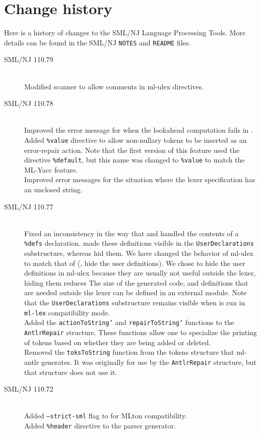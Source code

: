 %
\chapter{Change history}
\label{ch:history}

Here is a history of changes to the SML/NJ Language Processing Tools.
More details can be found in the SML/NJ \texttt{NOTES} and \texttt{README} files.
\begin{description}
  \item[SML/NJ 110.79]
    \mbox{}\\[0.5em]
    Modified scanner to allow comments in ml-ulex directives.
  \item[SML/NJ 110.78]
    \mbox{}\\[0.5em]
    Improved the error message for when the lookahead computation fails in \mlantlr{}.
    \\[0.5em]
    Added \texttt{\%value} directive to allow non-nullary tokens to be inserted as
    an error-repair action.
    Note that the first version of this feature used the directive \texttt{\%default}, but
    this name was changed to \texttt{\%value} to match the ML-Yacc feature.
    \\[0.5em]
    Improved error messages for the situation where the lexer specification has an unclosed string.
  \item[SML/NJ 110.77]
    \mbox{}\\[0.5em]
    Fixed an inconsistency in the way that \mlantlr{} and \ulex{} handled the contents of
    a \texttt{\%defs} declaration.  \ulex{} made these definitions visible in the \texttt{UserDeclarations}
    substructure, whereas \mlantlr{} hid them.  We have changed the behavior of ml-ulex to match
    that of \mlantlr{} (\ie{}, hide the user definitions).  We chose to hide the user definitions
    in ml-ulex because they are usually not useful outside the lexer, hiding them reduces The
    size of the generated code, and definitions that are needed outside the lexer can be
    defined in an external module.  Note that the \texttt{UserDeclarations} substructure remains
    visible when \ulex{} is run in \texttt{ml-lex} compatibility mode.
    \\[0.5em]
    Added the \texttt{actionToString'} and \texttt{repairToString'} functions
    to the \texttt{AntlrRepair} structure.  These functions allow one to
    specialize the printing of tokens based on whether they are being added or deleted.
    \\[0.5em]
    Removed the \texttt{toksToString} function from the tokens structure that ml-antlr
    generates.  It was originally for use by the \texttt{AntlrRepair} structure, but that
    structure does not use it.
    \pagebreak
  \item[SML/NJ 110.72]
    \mbox{}\\[0.5em]
    Added \texttt{--strict-sml} flag to \ulex{} for MLton compatibility.
    \\[0.5em]
    Added \texttt{\%header} directive to the \mlantlr{} parser generator.
\end{description}%
